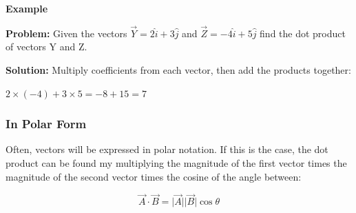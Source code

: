 		\begin{mdframed}[backgroundcolor=blue!10!white]
			\begin{center}
				\textbf{Example \thesubsection}	\label{example:dotproduct}
				
				
			\end{center}
		
		\textbf{Problem:} Given the vectors $ \vec{Y} = 2 \hat{i} + 3 \hat{j} $ and $\vec{Z} = -4 \hat{i} + 5 \hat{j}$ find the dot product of vectors Y and Z. 
		
		\vspace{.1in}
		
		\textbf{Solution:} Multiply coefficients from each vector, then add the products together:
		\begin{center}
			$2\times(-4) + 3\times 5 = -8 + 15 = \boxed{7}$ 
		\end{center}
		
		
		\end{mdframed}
	\subsubsection{In Polar Form}
	Often, vectors will be expressed in polar notation.  If this is the case, the dot product can be found my multiplying the magnitude of the first vector times the magnitude of the second vector times the cosine of the angle between:
	
	
	\begin{mdframed}[backgroundcolor=orange!20!white]
		\begin{equation}
		\vec{A} \cdot \vec{B} = \lvert \vec{A} \rvert  \lvert \vec{B} \rvert \cos{\theta}
		\end{equation}
		
	\end{mdframed}
	
	
	\vspace{0.1in}
	
